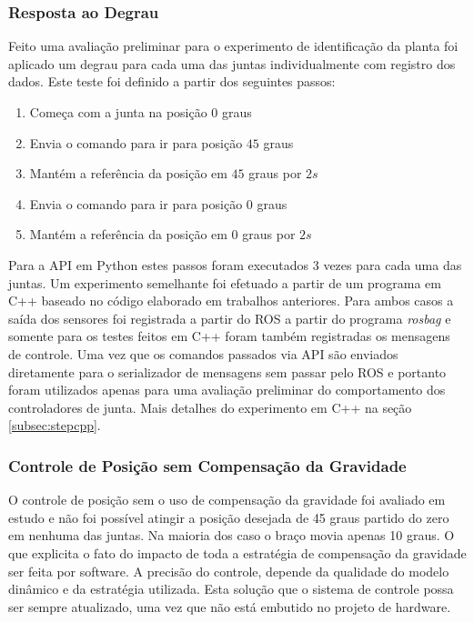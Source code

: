 
\subsubsection{Resposta ao Degrau}

Feito uma avaliação preliminar para o experimento de identificação da planta foi aplicado um degrau para cada uma das juntas individualmente com registro dos dados. Este teste foi definido a partir dos seguintes passos:

\begin{enumerate}
    \item Começa com a junta na posição $0$ graus
    \item Envia o comando para ir para posição $45$ graus
    \item Mantém a referência da posição em $45$ graus por $2s$
    \item Envia o comando para ir para posição $0$ graus
    \item Mantém a referência da posição em $0$ graus por $2s$
\end{enumerate}

Para a API em Python estes passos foram executados 3 vezes para cada uma das juntas. Um experimento semelhante foi efetuado a partir de um programa em C++ baseado no código elaborado em trabalhos anteriores. Para ambos casos a saída dos sensores foi registrada a partir do ROS a partir do programa \textit{rosbag} e somente para os testes feitos em C++ foram também registradas os mensagens de controle. Uma vez que os comandos passados via API são enviados diretamente para o serializador de mensagens sem passar pelo ROS e portanto foram utilizados apenas para uma avaliação preliminar do comportamento dos controladores de junta. Mais detalhes do experimento em C++ na seção \ref{subsec:stepcpp}. 


\subsubsection{Controle de Posição sem Compensação da Gravidade}

O controle de posição sem o uso de compensação da gravidade foi avaliado em estudo e não foi possível atingir a posição desejada de 45 graus partido do zero em nenhuma das juntas. Na maioria dos caso o braço movia apenas 10 graus. O que explicita o fato do impacto de toda a estratégia de compensação da gravidade ser feita por software. A precisão do controle, depende da qualidade do modelo dinâmico e da estratégia utilizada. Esta solução que o sistema de controle possa ser sempre atualizado, uma vez que não está embutido no projeto de hardware.


